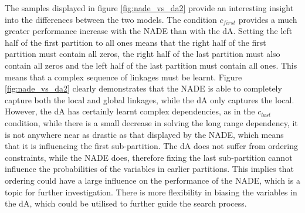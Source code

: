 \documentclass[twoside]{article}
\begin{document}
The samples displayed in figure \ref{fig:nade_vs_da2} provide an interesting insight into the differences between the two models. The condition \(c_{first}\) provides a much greater performance increase with the NADE than with the dA. Setting the left half of the first partition to all ones means that the right half of the first partition must contain all zeros, the right half of the last partition must also contain all zeros and the left half of the last partition must contain all ones. This means that a complex sequence of linkages must be learnt. Figure \ref{fig:nade_vs_da2} clearly demonstrates that the NADE is able to completely capture both the local and global linkages, while the dA only captures the local. However, the dA has certainly learnt complex dependencies, as in the \(c_{last}\) condition, while there is a small decrease in solving the long range dependency, it is not anywhere near as drastic as that displayed by the NADE, which means that it is influencing the first sub-partition. The dA does not suffer from ordering constraints, while the NADE does, therefore fixing the last sub-partition cannot influence the probabilities of the variables in earlier partitions. This implies that ordering could have a large influence on the performance of the NADE, which is a topic for further investigation. There is more flexibility in biasing the variables in the dA, which could be utilised to further guide the search process.
\end{document}
